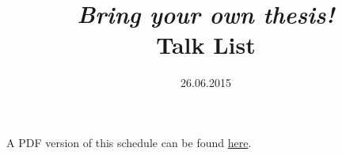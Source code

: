 \documentclass[12pt, a4paper, english]{article}
\title{\emph{Bring your own thesis!} \\ Talk List}
\date{26.06.2015}
\begin{document}
\maketitle

A PDF version of this schedule can be found \href{schedule.pdf}{here}.


\end{document}
